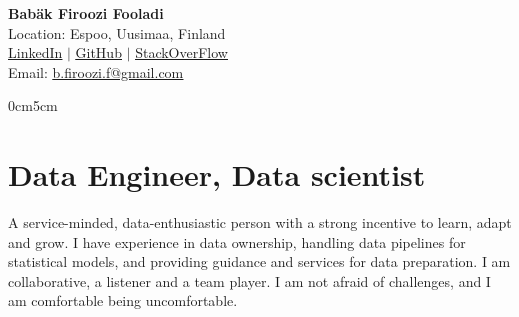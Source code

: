 \documentclass[a4paper,11pt]{article}
\begin{document}




\noindent

{\Huge \textbf{Babäk Firoozi Fooladi}} \vspace{4pt} \\
Location: Espoo, Uusimaa, Finland \\
\href{https://www.linkedin.com/in/babak-firoozi-fooladi/}{\uline{LinkedIn}} $|$
\href{https://github.com/Babakfifoo}{\uline{GitHub}} $|$
\href{https://stackoverflow.com/users/5116559/babak-fi-foo}{\uline{StackOverFlow}} \\
Email: \href{mailto:b.firoozi.f@gmail.com}{\uline{b.firoozi.f@gmail.com}} \\



\begin{adjustwidth}{0cm}{5cm}
\section{Data Engineer, Data scientist}

  \small{
A service-minded, data-enthusiastic person with a strong incentive to learn, adapt and grow. I have experience in data ownership, handling data pipelines for statistical models, and providing guidance and services for data preparation. I am collaborative, a listener and a team player. I am not afraid of challenges, and I am comfortable being uncomfortable.
  }

\end{adjustwidth}



\vspace*{7.8cm - \the\pagetotal}

\end{document}
